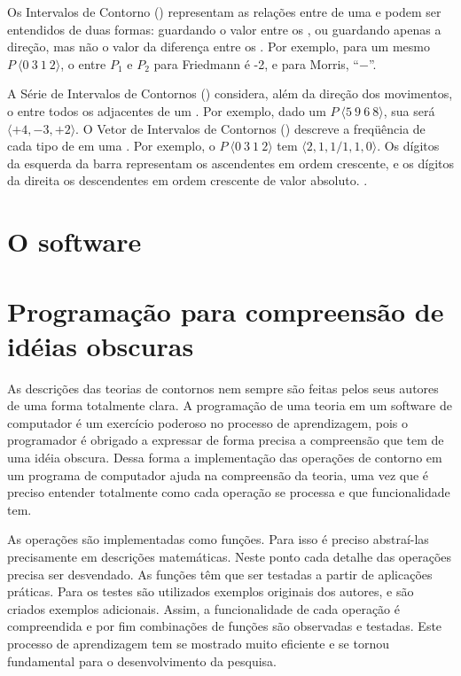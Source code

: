 Os Intervalos de Contorno () representam as relações entre
 de uma  e podem ser entendidos de duas
formas: guardando o valor entre os 
\cite{friedmann85:methodology}, ou guardando apenas a direção, mas não
o valor da diferença entre os 
\cite{morris93:directions}. Por exemplo, para um mesmo 
$P\:\langle0\:3\:1\:2\rangle$, o  entre $P_1$ e $P_2$ para
Friedmann é -2, e para Morris, ``$-$''.

A Série de Intervalos de Contornos () considera, além da
direção dos movimentos, o  entre todos os 
adjacentes de um . Por exemplo, dado um 
$P\:\langle5\:9\:6\:8\rangle$, sua  será
$\langle+4,-3,+2\rangle$. O Vetor de Intervalos de Contornos
() descreve a freqüência de cada tipo de  em uma
. Por exemplo, o  $P\:\langle0\:3\:1\:2\rangle$
tem  $\langle2,1,1/1,1,0\rangle$. Os dígitos da esquerda da
barra representam os  ascendentes em ordem crescente, e os
dígitos da direita os  descendentes em ordem crescente de
valor absoluto. \cite{friedmann85:methodology}.


\section{O software}
\label{sec:o-software}

\section{Programação para compreensão de idéias obscuras}
\label{sec:progr-para-compr}

As descrições das teorias de contornos nem sempre são feitas pelos
seus autores de uma forma totalmente clara. A programação de uma
teoria em um software de computador é um exercício poderoso no
processo de aprendizagem, pois o programador é obrigado a expressar de
forma precisa a compreensão que tem de uma idéia obscura. Dessa forma
a implementação das operações de contorno em um programa de computador
ajuda na compreensão da teoria, uma vez que é preciso entender
totalmente como cada operação se processa e que funcionalidade tem.

As operações são implementadas como funções. Para isso é preciso
abstraí-las precisamente em descrições matemáticas. Neste ponto cada
detalhe das operações precisa ser desvendado. As funções têm que ser
testadas a partir de aplicações práticas. Para os testes são
utilizados exemplos originais dos autores, e são criados exemplos
adicionais. Assim, a funcionalidade de cada operação é compreendida e
por fim combinações de funções são observadas e testadas. Este
processo de aprendizagem tem se mostrado muito eficiente e se tornou
fundamental para o desenvolvimento da pesquisa.

